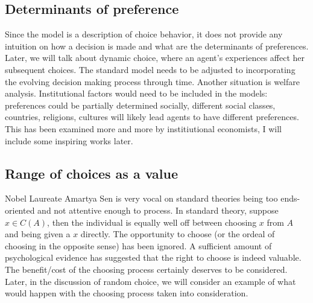 \subsection*{Determinants of preference}
Since the model is a description of choice behavior, it does not provide any intuition on how a decision is made and what are the determinants of preferences. Later, we will talk about dynamic choice, where an agent's experiences affect her subsequent choices.
The standard model needs to be adjusted to incorporating the evolving decision making process through time. Another situation is welfare analysis. Institutional factors would need to be included in the models: preferences could be partially determined socially,
different social classes, countries, religions, cultures will likely lead agents to have different preferences. This has been examined more and more by institiutional economists, I will include some inspiring works later.

\subsection*{Range of choices as a value}
Nobel Laureate Amartya Sen is very vocal on standard theories being too ends-oriented and not attentive enough to process. In standard theory, suppose $x\in C(A)$, then the individual is equally well off between choosing $x$ from $A$ and being given a $x$ directly.
The opportunity to choose (or the ordeal of choosing in the opposite sense) has been ignored. A sufficient amount of psychological evidence has suggested that the right to choose is indeed valuable. The benefit/cost of the choosing process certainly deserves to be considered.
Later, in the discussion of random choice, we will consider an example of what would happen with the choosing process taken into consideration.